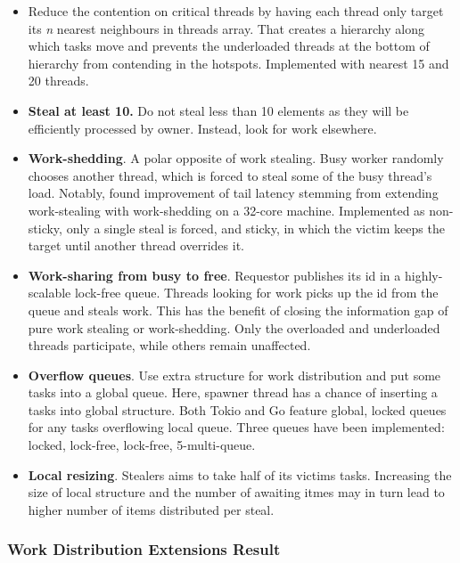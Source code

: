\documentclass[12pt,a4paper,twoside]{report}
\begin{document}
\begin{itemize}
    \item Reduce the contention on critical threads by having each thread only target its \textit{n} nearest neighbours in threads array. That creates a hierarchy along which tasks move and prevents the underloaded threads at the bottom of hierarchy from contending in the hotspots. Implemented with nearest 15 and 20 threads.
    \item \textbf{Steal at least 10.} Do not steal less than 10 elements as they will be efficiently processed by owner. Instead, look for work elsewhere. 
    \item \textbf{Work-shedding}. A polar opposite of work stealing. Busy worker randomly chooses another thread, which is forced to steal some of the busy thread's load. Notably, \cite{workshed} found improvement of tail latency stemming from extending work-stealing with work-shedding on a 32-core machine. Implemented as non-sticky, only a single steal is forced, and sticky, in which the victim keeps the target until another thread overrides it. 
    \item \textbf{Work-sharing from busy to free}. Requestor publishes its id in a highly-scalable lock-free queue. Threads looking for work picks up the id from the queue and steals work. This has the benefit of closing the information gap of pure work stealing or work-shedding. Only the overloaded and underloaded threads participate, while others remain unaffected.
    \item \textbf{Overflow queues}. Use extra structure for work distribution and put some tasks into a global queue. Here, spawner thread has a chance of inserting a tasks into global structure. Both Tokio \cite{Makingth53:online} and Go \cite{goprocgo14:online} feature global, locked queues for any tasks overflowing local queue. Three queues have been implemented: locked, lock-free, lock-free, 5-multi-queue. 
    \item \textbf{Local resizing}. Stealers aims to take half of its victims tasks. Increasing the size of local structure and the number of awaiting itmes may in turn lead to higher number of items distributed per steal. 
\end{itemize}



\subsubsection{Work Distribution Extensions Result} 
\label{section:extensions_result}
\end{document}
